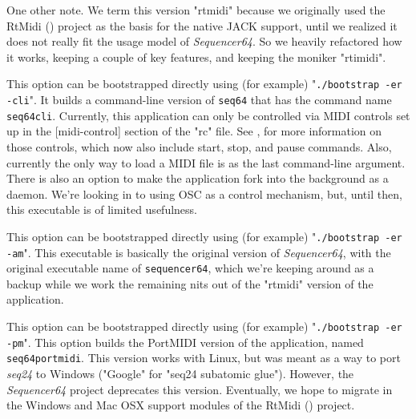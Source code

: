         One other note.  We term this version "rtmidi" because we originally
        used the RtMidi (\cite{rtmidi}) project as the basis for the native
        JACK support, until we realized it does not really fit the usage model
        of \textsl{Sequencer64}.  So we heavily refactored how it works,
        keeping a couple of key features, and keeping the moniker "rtimidi".

        This option can be bootstrapped directly using (for example)
        "\texttt{./bootstrap -er -cli}".
        It builds a command-line version of \texttt{seq64} that has the command
        name \texttt{seq64cli}.  Currently, this application can only be
        controlled via MIDI controls set up in the
        [midi-control] section of the "rc" file.
        See , for more
        information on those controls, which now also include start, stop, and
        pause commands.  Also, currently the only way to load a MIDI file is as
        the last command-line argument.  There is also an option to make
        the application fork into the background as a daemon.
        We're looking in to using OSC as a control mechanism, but, until then,
        this executable is of limited usefulness.

        This option can be bootstrapped directly using (for example)
        "\texttt{./bootstrap -er -am}".
        This executable is basically the original version of 
        \textsl{Sequencer64}, with the original executable name of
        \texttt{sequencer64}, which we're keeping around as a backup while we
        work the remaining nits out of the "rtmidi" version of the application.

        This option can be bootstrapped directly using (for example)
        "\texttt{./bootstrap -er -pm}".
        This option builds the PortMIDI version of the application,
        named \texttt{seq64portmidi}.  This version works with Linux, but was
        meant as a way to port \textsl{seq24} to Windows ("Google" for
        "seq24 subatomic glue").  However, the \textsl{Sequencer64} project
        deprecates this version.  Eventually, we hope to migrate in
        the Windows and Mac OSX support modules of the RtMidi
        (\cite{rtmidi}) project.

